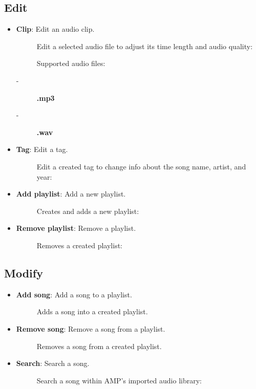 \documentclass{article}
\begin{document}
\subsection{Edit}

\begin{itemize}
    \item \textbf{Clip}: Edit an audio clip.
    \begin{description}
        \item[] Edit a selected audio file to adjust its time length and audio quality: 
        \item[]Supported audio files: 
        \item[-]\textbf{.mp3}
        \item[-]\textbf{.wav}
    \end{description}
    \item \textbf{Tag}: Edit a tag.
    \begin{description}
        \item[] Edit a created tag to change info about the song name, artist, and year: 
    \end{description}
    \item \textbf{Add playlist}: Add a new playlist.
    \begin{description}
        \item[] Creates and adds a new playlist: 
    \end{description}
    \item \textbf{Remove playlist}: Remove a playlist.
        \begin{description}
        \item[] Removes a created playlist: 
    \end{description}
\end{itemize}

\subsection{Modify}

\begin{itemize}
    \item \textbf{Add song}: Add a song to a playlist.
    \begin{description}
        \item[] Adds a song into a created playlist.
    \end{description}
    \item \textbf{Remove song}: Remove a song from a playlist.
    \begin{description}
        \item[] Removes a song from a created playlist.
    \end{description}
    \item \textbf{Search}: Search a song.
    \begin{description}
        \item[] Search a song within AMP's imported audio library: 
    \end{description}
\end{itemize}
\end{document}
